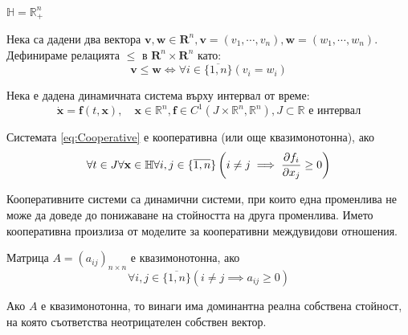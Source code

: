 \begin{definition}
  $\mathbb{H} = \mathbb{R}_{+}^n$
\end{definition}

\begin{definition}
  Нека са дадени два вектора $\mathbf{v}, \mathbf{w} \in \mathbf{R}^n, \mathbf{v}=(v_1, \cdots, v_n), \mathbf{w}=(w_1, \cdots, w_n)$. Дефинираме релацията $\leq$ в $\mathbf{R}^n \times \mathbf{R}^n$ като:
  \begin{equation*}
    \mathbf{v} \leq \mathbf{w} \iff \forall{i \in \{\overline{1,n}\}}(v_i = w_i)
  \end{equation*}
\end{definition}

Нека е дадена динамичната система върху интервал от време:
\begin{equation}
  \label{eq:Cooperative}
  \dot{\mathbf{x}} = \mathbf{f}(t, \mathbf{x}),  \quad \mathbf{x} \in \mathbb{R}^n, \mathbf{f} \in C^1(J \times \mathbb{R}^n, \mathbb{R}^n), J \subset \mathbb{R} \text{ е интервал}
\end{equation}

\begin{definition}
  \label{def:Cooperative}
  Системата \eqref{eq:Cooperative} е кооперативна (или още квазимонотонна), ако
  \begin{equation}
    \forall{t \in J}\forall{\mathbf{x} \in \mathbb{H}}\forall{i,j \in \{\overline{1,n}\}}\left(i \neq j \implies \pdv{f_i}{x_j}(t, \mathbf{x}) \geq 0\right)
  \end{equation}
\end{definition}
Кооперативните системи са динамични системи, при които една променлива не може да доведе до понижаване на стойността на друга променлива. Името кооперативна произлиза от моделите за кооперативни междувидови отношения.

\begin{definition}
  Матрица $A=(a_{ij})_{n \times n}$ е квазимонотонна, ако
  \begin{equation*}
    \forall{i,j \in \{\overline{1,n}\}} \left(i \neq j \implies a_{ij} \geq 0\right)
  \end{equation*}
\end{definition}

\begin{theorem}
  Ако $A$ е квазимонотонна, то винаги има доминантна реална собствена стойност, на която съответства неотрицателен собствен вектор.
\end{theorem}

